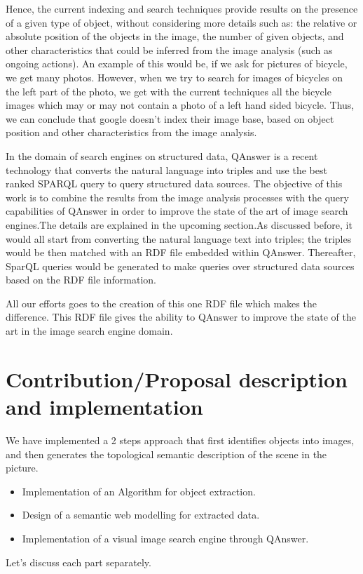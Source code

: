 \documentclass[12pt]{article}
\begin{document}
Hence, the current indexing and search techniques provide results on the presence of a given type of object, without considering more details such as: the relative or absolute position of the objects in the image, the number of given objects, and other characteristics that could be inferred from the image analysis (such as ongoing actions). An example of this would be, if  we ask for pictures of bicycle, we get many photos. However, when we try to search for images of bicycles on the left part of the photo, we get with the current techniques all the bicycle images which may or may not contain a photo of a left hand sided bicycle.
Thus, we can conclude that google doesn't index their image base, based on object position and other characteristics from the image analysis.


In the domain of search engines on structured data, QAnswer is a recent technology that converts the natural language into triples and use the best ranked SPARQL query to query structured data sources. The objective of this work is to combine the results from the image analysis processes with the query capabilities of QAnswer in order to improve the state of the art of image search engines.The details are explained in the upcoming section.As discussed before, it would all start from converting the natural language text into triples; the triples would be then matched with an RDF file embedded within QAnswer. Thereafter, SparQL queries would be generated to make queries over structured data sources based on the RDF file information.


All our efforts goes to the creation of this one RDF file which makes the difference. This RDF file gives the ability to QAnswer to improve the state of the art in the image search engine domain.

\section{Contribution/Proposal description and implementation} 
We have implemented a 2 steps approach that first identifies objects
into images, and then generates the topological semantic description of
the scene in the picture. 
\begin{itemize}
\item Implementation of an Algorithm for object extraction. 
\item Design of a semantic web modelling for extracted data.
\item Implementation of a visual image search engine through QAnswer.\end{itemize}
Let's discuss each part separately.
\newpage
\end{document}
